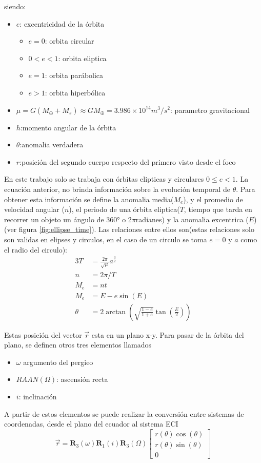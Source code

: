 siendo: 
\begin{itemize}
	\item $e$: excentricidad de la órbita
	\begin{itemize}
		\item $e = 0$: orbita circular
		\item $0<e <1$: orbita eliptica
		\item $e=1$: orbita parábolica
		\item $e>1$: orbita hiperbólica		
	\end{itemize}
	\item $\mu = G(M_{\oplus}+M_s) \approx G M_{\oplus} = 3.986 \times 10^{14} m^3/s^2 $: parametro gravitacional
	\item $h$:momento angular de la órbita
	\item $\theta$:anomalia verdadera
	\item $r$:posición del segundo cuerpo respecto del primero visto desde el foco
\end{itemize}

En este trabajo solo se trabaja con órbitas elipticas y circulares $0\leq e < 1$. La ecuación anterior, no brinda información sobre la evolución temporal de $\theta$. Para obtener esta información se define la anomalia media($M_e$), y el promedio de velocidad angular ($n$), el periodo de una órbita eliptica($T$, tiempo que tarda en recorrer un objeto un ángulo de 360° o 2$\pi $radianes) y la anomalia excentrica ($E$)(ver figura \ref{fig:ellipse_time}). Las relaciones entre ellos son(estas relaciones solo son validas en elipses y circulos, en el caso de un circulo se toma $e =0$ y $a$ como el radio del circulo):  
\begin{alignat}{3}
	T &= \frac{2\pi}{\sqrt{\mu}} a^{\frac{3}{2}} \\
	n &= 2\pi / T \\ 
	M_e &= nt \\
	M_e &= E-e\sin(E) \\
	\theta &= 2\arctan({  \sqrt{\frac{1-e}{1+e}}\tan(\frac{E}{2})})
\end{alignat}

Estas posición del vector $\vec{r}$ esta en un plano x-y. Para pasar de la órbita del plano, se definen otros tres elementos llamados
\begin{itemize}
	\item $\omega$ argumento del pergieo 
	\item $RAAN (\Omega)$: ascensión recta 
	\item $i$: inclinación  
\end{itemize}
A partir de estos elementos se puede realizar la conversión entre sistemas de coordenadas, desde el plano del ecuador al sistema ECI 
\begin{equation}
	\vec{r} = \mathbf{R}_3(\omega) \mathbf{R}_1(i) \mathbf{R}_3(\Omega)\begin{bmatrix}
		r(\theta)\cos(\theta) \\ 
		r(\theta)\sin(\theta) \\ 
		0
	\end{bmatrix}
\end{equation}



